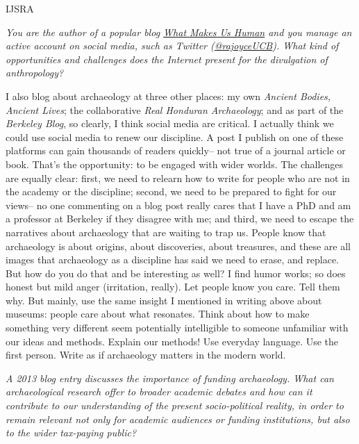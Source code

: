 \begin{labeling}{IJSRA}
\item[IJSRA] \emph{You are the author of a popular blog \href{https://www.psychologytoday.com/blog/what-makes-us-human}{What Makes Us Human} and you manage an active account on social media, such as Twitter (\href{https://twitter.com/rajoyceucb}{@rajoyceUCB}). What kind of opportunities and challenges does the Internet present for the divulgation of anthropology?}
	
\item[RAJ] I also blog about archaeology at three other places: my own \emph{Ancient Bodies, Ancient Lives}; the collaborative \emph{Real Honduran Archaeology}; and as part of the \emph{Berkeley Blog}, so clearly, I think social media are critical. I actually think we could use social media to renew our discipline. A post I publish on one of these platforms can gain thousands of readers quickly-- not true of a journal article or book. That's the opportunity: to be engaged with wider worlds. The challenges are equally clear: first, we need to relearn how to write for people who are not in the academy or the discipline; second, we need to be prepared to fight for our views-- no one commenting on a blog post really cares that I have a PhD and am a professor at Berkeley if they disagree with me; and third, we need to escape the narratives about archaeology that are waiting to trap us. People know that archaeology is about origins, about discoveries, about treasures, and these are all images that archaeology as a discipline has said we need to erase, and replace. But how do you do that and be interesting as well? I find humor works; so does honest but mild anger (irritation, really). Let people know you care. Tell them why. But mainly, use the same insight I mentioned in writing above about museums: people care about what resonates. Think about how to make something very different seem potentially intelligible to someone unfamiliar with our ideas and methods. Explain our methods! Use everyday language. Use the first person. Write as if archaeology matters in the modern world. 
	
\item[IJSRA] \emph{A 2013 blog entry discusses the importance of funding archaeology. What can archaeological research offer to broader academic debates and how can it contribute to our understanding of the present socio-political reality, in order to remain relevant not only for academic audiences or funding institutions, but also to the wider tax-paying public?}


\end{labeling}
